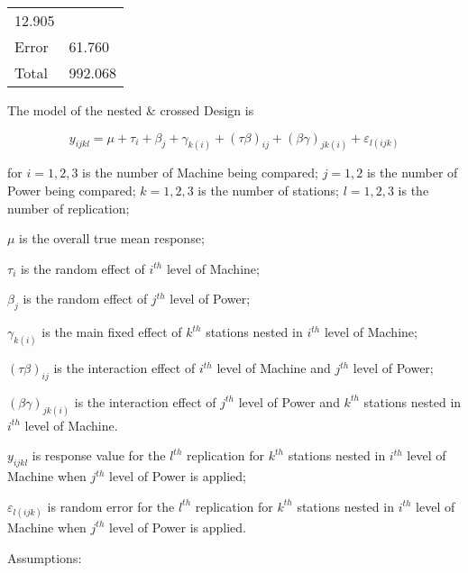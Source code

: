 \documentclass[12pt,]{article}
\begin{document}
\begin{longtable}[]{@{}ll@{}}
\begin{minipage}[t]{0.13\columnwidth}
12.905\strut
\end{minipage}\tabularnewline
\begin{minipage}[t]{0.35\columnwidth}\raggedright
Error\strut
\end{minipage} & \begin{minipage}[t]{0.13\columnwidth}\raggedright
61.760\strut
\end{minipage}\tabularnewline
\begin{minipage}[t]{0.35\columnwidth}\raggedright
Total\strut
\end{minipage} & \begin{minipage}[t]{0.13\columnwidth}\raggedright
992.068\strut
\end{minipage}\tabularnewline
\bottomrule
\end{longtable}

The model of the nested \& crossed Design is

\[y_{ijkl}=\mu+\tau_i+\beta_{j}+\gamma_{k(i)}+(\tau\beta)_{ij}+(\beta\gamma)_{jk(i)}+\varepsilon_{l(ijk)}\]

for \(i=1,2,3\) is the number of Machine being compared; \(j=1,2\) is
the number of Power being compared; \(k=1,2,3\) is the number of
stations; \(l=1,2,3\) is the number of replication;

\(\mu\) is the overall true mean response;

\(\tau_i\) is the random effect of \(i^{th}\) level of Machine;

\(\beta_{j}\) is the random effect of \(j^{th}\) level of Power;

\(\gamma_{k(i)}\) is the main fixed effect of \(k^{th}\) stations nested
in \(i^{th}\) level of Machine;

\((\tau\beta)_{ij}\) is the interaction effect of \(i^{th}\) level of
Machine and \(j^{th}\) level of Power;

\((\beta\gamma)_{jk(i)}\) is the interaction effect of \(j^{th}\) level
of Power and \(k^{th}\) stations nested in \(i^{th}\) level of Machine.

\(y_{ijkl}\) is response value for the \(l^{th}\) replication for
\(k^{th}\) stations nested in \(i^{th}\) level of Machine when
\(j^{th}\) level of Power is applied;

\(\varepsilon_{l(ijk)}\) is random error for the \(l^{th}\) replication
for \(k^{th}\) stations nested in \(i^{th}\) level of Machine when
\(j^{th}\) level of Power is applied.

Assumptions:
\end{document}
